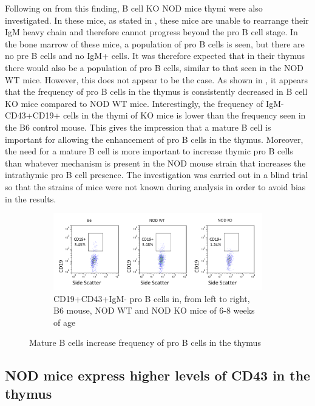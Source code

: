 Following on from this finding, B cell KO NOD mice thymi were also investigated.
In these mice, as stated in , these mice are unable to rearrange their IgM heavy chain and therefore cannot progress beyond the pro B cell stage. 
In the bone marrow of these mice, a population of pro B cells is seen, but there are no pre B cells and no IgM+ cells.
It was therefore expected that in their thymus there would also be a population of pro B cells, similar to that seen in the NOD WT mice. 
However, this does not appear to be the case.
As shown in , it appears that the frequency of pro B cells in the thymus is consistently decreased in B cell KO mice compared to NOD WT mice.
Interestingly, the frequency of IgM-CD43+CD19+ cells in the thymi of KO mice is lower than the frequency seen in the B6 control mouse. 
This gives the impression that a mature B cell is important for allowing the enhancement of pro B cells in the thymus.
Moreover, the need for a mature B cell is more important to increase thymic pro B cells than whatever mechanism is present in the NOD mouse strain that increases the intrathymic pro B cell presence.
The investigation was carried out in a blind trial so that the strains of mice were not known during analysis in order to avoid bias in the results.

\begin{figure}
	\begin{subfigure}{\textwidth}
	\includegraphics[width=\textwidth]{Figures/MatureBincproB.png}
	\caption{CD19+CD43+IgM- pro B cells in, from left to right, B6 mouse, NOD WT and NOD KO mice of 6-8 weeks of age}
	\end{subfigure}
\caption{Mature B cells increase frequency of pro B cells in the thymus}
\end{figure}


\subsection{NOD mice express higher levels of CD43 in the thymus}

